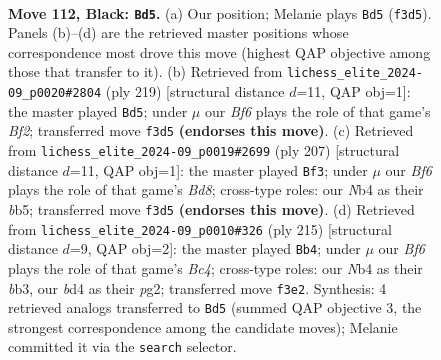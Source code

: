 \documentclass[11pt]{article}
\begin{document}
\clearpage

\begin{figure}[p]\centering
\begin{subfigure}{0.46\textwidth}\centering
\resizebox{\linewidth}{!}{%
\newchessgame
\chessboard[
  setfen={8/8/8/7k/1n1B4/5b2/5P2/6K1 b - - 70 112},
  showmover=false,
  pgfstyle=straightmove, color=movearrow, markmove={f3-d5}
]}
\caption{}
\end{subfigure}\hfill
\begin{subfigure}{0.46\textwidth}\centering
\resizebox{\linewidth}{!}{%
\newchessgame
\chessboard[
  setfen={8/5b2/5P2/8/1K6/3k4/8/B7 b - - 34 110},
  showmover=false,
  pgfstyle=straightmove, color=movearrow, markmove={f7-d5}
]}
\caption{}
\end{subfigure}
\\[4pt]
\begin{subfigure}{0.46\textwidth}\centering
\resizebox{\linewidth}{!}{%
\newchessgame
\chessboard[
  setfen={8/8/8/1B6/3k4/P7/1K6/3b4 b - - 30 104},
  showmover=false,
  pgfstyle=straightmove, color=movearrow, markmove={d1-f3}
]}
\caption{}
\end{subfigure}\hfill
\begin{subfigure}{0.46\textwidth}\centering
\resizebox{\linewidth}{!}{%
\newchessgame
\chessboard[
  setfen={8/4k3/8/2b1P3/4K3/1B6/6P1/8 b - - 16 108},
  showmover=false,
  pgfstyle=straightmove, color=movearrow, markmove={c5-b4}
]}
\caption{}
\end{subfigure}
\caption{\textbf{Move 112, Black: \texttt{Bd5}.} (a) Our position; Melanie plays \texttt{Bd5} (\texttt{f3d5}). Panels (b)--(d) are the retrieved master positions whose correspondence most drove this move (highest QAP objective among those that transfer to it). (b) Retrieved from \texttt{lichess\_elite\_2024-09\_p0020\#2804} (ply 219) [structural distance $d$=11, QAP obj=1]: the master played \texttt{Bd5}; under $\mu$ our \emph{Bf6} plays the role of that game's \emph{Bf2}; transferred move \texttt{f3d5} \textbf{(endorses this move)}. (c) Retrieved from \texttt{lichess\_elite\_2024-09\_p0019\#2699} (ply 207) [structural distance $d$=11, QAP obj=1]: the master played \texttt{Bf3}; under $\mu$ our \emph{Bf6} plays the role of that game's \emph{Bd8}; cross-type roles: our \emph{N}b4 as their \emph{b}b5; transferred move \texttt{f3d5} \textbf{(endorses this move)}. (d) Retrieved from \texttt{lichess\_elite\_2024-09\_p0010\#326} (ply 215) [structural distance $d$=9, QAP obj=2]: the master played \texttt{Bb4}; under $\mu$ our \emph{Bf6} plays the role of that game's \emph{Bc4}; cross-type roles: our \emph{N}b4 as their \emph{b}b3, our \emph{b}d4 as their \emph{p}g2; transferred move \texttt{f3e2}. Synthesis: 4 retrieved analogs transferred to \texttt{Bd5} (summed QAP objective 3, the strongest correspondence among the candidate moves); Melanie committed it via the \texttt{search} selector.}
\label{fig:thought-m223}
\end{figure}
\end{document}
